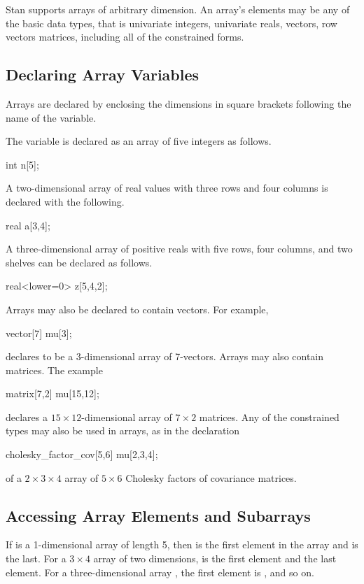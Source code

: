 Stan supports arrays of arbitrary dimension.  An array's elements may
be any of the basic data types, that is univariate integers,
univariate reals, vectors, row vectors matrices, including all of the
constrained forms.

\subsection{Declaring Array Variables}

Arrays are declared by enclosing the dimensions in square brackets
following the name of the variable.

The variable  is declared as an array of five integers as follows.
%
\begin{stancode}
int n[5];
\end{stancode}
%
A two-dimensional array of real values with three rows and four columns is
declared with the following.
%
\begin{stancode}
real a[3,4];
\end{stancode}
%
A three-dimensional array  of positive reals with five rows, four
columns, and two shelves can be declared as follows.
%
\begin{stancode}
real<lower=0> z[5,4,2];
\end{stancode}
%

Arrays may also be declared to contain vectors.  For example,
%
\begin{stancode}
vector[7] mu[3];
\end{stancode}
%
declares  to be a 3-dimensional array of 7-vectors.
Arrays may also contain matrices.  The example
%
\begin{stancode}
matrix[7,2] mu[15,12];
\end{stancode}
%
declares a $15 \times 12$-dimensional array of $7 \times 2$ matrices.
Any of the constrained types may also be used in arrays, as in the
declaration
%
\begin{stancode}
cholesky_factor_cov[5,6] mu[2,3,4];
\end{stancode}
%
of a $2 \times 3 \times 4$ array of $5 \times 6$ Cholesky factors of
covariance matrices.

\subsection{Accessing Array Elements and Subarrays}

If  is a 1-dimensional array of length 5, then  is
the first element in the array and  is the last.  For a $3
\times 4$ array  of two dimensions,  is the first
element and  the last element.  For a three-dimensional
array , the first element is , and so on.


